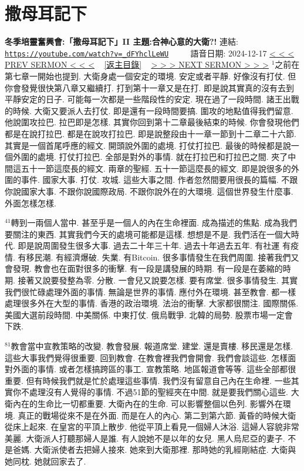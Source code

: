 \documentclass{book}
\begin{document}
\section{撒母耳記下}
\label{sec:_dFYhclLeWU}
\textbf{冬季培靈奮興會:「撒母耳記下」II 主題:合神心意的大衛?!}
\newline
\newline
連結: \href{https://youtube.com/watch?v=_dFYhclLeWU}{\texttt{https://youtube.com/watch?v=\_dFYhclLeWU}} ~~~~ 語音日期: 2024-12-17
\newline
\newline
\hyperref[sec:KKs6xvdps8w]{\small{< < < PREV SERMON < < <}}
~
\hyperref[sec:index]{\small{[返主目錄]}}
~
\hyperref[sec:m_AdQi66HCM]{\small{> > > NEXT SERMON > > >}}
\newline
\newline
$^{1}$之前在第七章一開始也提到.
大衛身處一個安定的環境.
安定或者平靜.
好像沒有打仗.
但你會發覺很快第八章又繼續打.
打到第十一章又是在打.
即是說其實真的沒有去到平靜安定的日子.
可能每一次都是一些階段性的安定.
現在過了一段時間.
諸王出戰的時候.
大衛又要派人去打仗.
即是還有一段時間要搞.
圍攻的地點值得我們留意.
他說圍攻拉巴.
拉巴即是怎樣.
其實你回到第十二章最後結束的時候.
你會發現他們都是在說打拉巴.
都是在說攻打拉巴.
即是說整段由十一章一節到十二章二十六節.
其實是一個首尾呼應的經文.
開頭說外圍的處境.
打仗打拉巴.
最後的時候都是說一個外圍的處境.
打仗打拉巴.
全部是對外的事情.
就在打拉巴和打拉巴之間.
夾了中間這五十一節這麼長的經文.
兩章的聖經.
五十一節這麼長的經文.
即是說很多的外圍的事件.
國家大事.
打仗.
攻城.
這些大事之間.
作者忽然間要用很長的篇幅.
不跟你說國家大事.
不跟你說國際政局.
不跟你說外在的大環境.
這個世界發生什麼事.
外面怎樣怎樣.

$^{41}$轉到一兩個人當中.
甚至乎是一個人的內在生命裡面.
成為描述的焦點.
成為我們要關注的東西.
其實我們今天的處境可能都是這樣.
想想是不是.
我們活在一個大時代.
即是說周圍發生很多大事.
過去二十年三十年.
過去十年過去五年.
有社運 有疫情.
有移民潮.
有經濟爆破.
失業.
有Bitcoin.
很多事情發生在我們周圍.
接著我們又會發現.
教會也在面對很多的衝擊.
有一段是講發展的時期.
有一段是在萎縮的時期.
接著又說要發整為零.
分散.
一會兒又說要怎樣.
要有席堂.
很多事情發生.
其實我們很忙碌處理外面的事情.
無論是世界的事情.
應付外在環境.
甚至教會.
都一樣處理很多外在大型的事情.
香港的政治環境.
法治的衝擊.
大家都很關注.
國際關係.
美國大選前段時間.
中美關係.
中東打仗.
俄烏戰爭.
北韓的局勢.
股票市場一定會下跌.

$^{81}$教會當中宣教策略的改變.
教會發展.
報道席堂.
建堂.
還是賣樓.
移民還是怎樣.
這些大事我們覺得很重要.
回到教會.
在教會裡我們會開會.
我們會談這些.
怎樣面對外面的事情.
或者怎樣搞跨區的事工.
宣教策略.
地區報道會等等.
這些全部都很重要.
但有時候我們就是忙於處理這些事情.
我們沒有留意自己內在生命裡.
一些其實你不處理沒有人覺得的事情.
不過51節的聖經夾在中間.
就是要我們關心這些.
大衛內在的生命比一切都重要.
大衛內在的生命.
可以影響整個以色列.
影響外在環境.
真正的戰場從來不是在外面.
而是在人的內心.
第二到第六節.
黃昏的時候大衛從床上起來.
在皇宮的平頂上散步.
他從平頂上看見一個婦人沐浴.
這婦人容貌非常美麗.
大衛派人打聽那婦人是誰.
有人說她不是以年的女兒.
黑人烏尼亞的妻子.
不是爸媽.
大衛派使者去把婦人接來.
她來到大衛那裡.
那時她的乳經剛結症.
大衛與她同枕.
她就回家去了.
\end{document}
